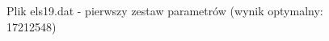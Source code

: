 \documentclass[12pt]{article}
\begin{document}
\begin{figure}
\caption[Podpis_do_spisu]{Plik els19.dat - pierwszy zestaw parametrów (wynik optymalny: 17212548)}
\end{figure}
\end{document}
